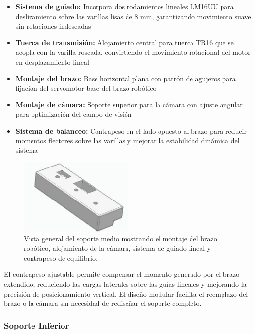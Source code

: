 \begin{itemize}
    \item \textbf{Sistema de guiado:} Incorpora dos rodamientos lineales LM16UU para deslizamiento sobre las varillas lisas de 8 mm, garantizando movimiento suave sin rotaciones indeseadas
    \item \textbf{Tuerca de transmisión:} Alojamiento central para tuerca TR16 que se acopla con la varilla roscada, convirtiendo el movimiento rotacional del motor en desplazamiento lineal
    \item \textbf{Montaje del brazo:} Base horizontal plana con patrón de agujeros para fijación del servomotor base del brazo robótico
    \item \textbf{Montaje de cámara:} Soporte superior para la cámara con ajuste angular para optimización del campo de visión
    \item \textbf{Sistema de balanceo:} Contrapeso en el lado opuesto al brazo para reducir momentos flectores sobre las varillas y mejorar la estabilidad dinámica del sistema
\end{itemize}

\begin{figure}[H]
    \centering
    \includegraphics[width=0.5\textwidth]{img/MedioReal_simplificado_vista.jpg}
    \caption{Vista general del soporte medio mostrando el montaje del brazo robótico, alojamiento de la cámara, sistema de guiado lineal y contrapeso de equilibrio.}
    \label{fig:soporte_medio_Real}
\end{figure}

El contrapeso ajustable permite compensar el momento generado por el brazo extendido, reduciendo las cargas laterales sobre las guías lineales y mejorando la precisión de posicionamiento vertical. El diseño modular facilita el reemplazo del brazo o la cámara sin necesidad de rediseñar el soporte completo.

\subsubsection{Soporte Inferior}

